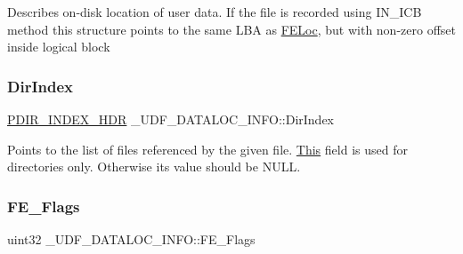 Describes on-\/disk location of user data. If the file is recorded using I\+N\+\_\+\+I\+CB method this structure points to the same L\+BA as \hyperlink{struct___u_d_f___d_a_t_a_l_o_c___i_n_f_o_a412523da551f2c58ace14d1ca23b5ec8}{F\+E\+Loc}, but with non-\/zero offset inside logical block \mbox{\label{struct___u_d_f___d_a_t_a_l_o_c___i_n_f_o_aefc2ae1a50056dcbd7fa7bae15a1931d}} 
\subsubsection{\texorpdfstring{Dir\+Index}{DirIndex}}
{\footnotesize\ttfamily \hyperlink{struct___d_i_r___i_n_d_e_x___h_d_r}{P\+D\+I\+R\+\_\+\+I\+N\+D\+E\+X\+\_\+\+H\+DR} \+\_\+\+U\+D\+F\+\_\+\+D\+A\+T\+A\+L\+O\+C\+\_\+\+I\+N\+F\+O\+::\+Dir\+Index}

Points to the list of files referenced by the given file. \hyperlink{namespace_this}{This} field is used for directories only. Otherwise its value should be N\+U\+LL. \mbox{\label{struct___u_d_f___d_a_t_a_l_o_c___i_n_f_o_a1b5650cc4b76759629799d5131b16d9f}} 
\subsubsection{\texorpdfstring{F\+E\+\_\+\+Flags}{FE\_Flags}}
{\footnotesize\ttfamily uint32 \+\_\+\+U\+D\+F\+\_\+\+D\+A\+T\+A\+L\+O\+C\+\_\+\+I\+N\+F\+O\+::\+F\+E\+\_\+\+Flags}

